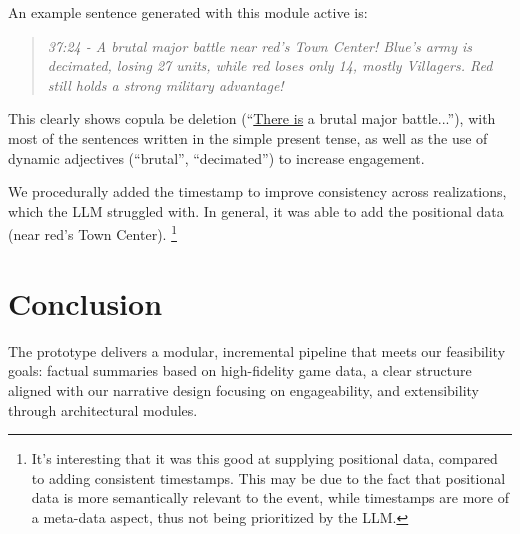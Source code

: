 An example sentence generated with this module active is:
\begin{quote}
  \textit{37:24 - A brutal major battle near red's Town Center! Blue's army is decimated, losing 27 units, while red loses only 14, mostly Villagers. Red still holds a strong military advantage!}
\end{quote}

This clearly shows copula be deletion (``\underline{There is} a brutal major battle...''), with most of the sentences written in the simple present tense, as well as the use of dynamic adjectives (``brutal'', ``decimated'') to increase engagement.

We procedurally added the timestamp to improve consistency across realizations, which the LLM struggled with. In general, it was able to add the positional data (near red's Town Center). \footnote{It's interesting that it was this good at supplying positional data, compared to adding consistent timestamps. This may be due to the fact that positional data is more semantically relevant to the event, while timestamps are more of a meta-data aspect, thus not being prioritized by the LLM.}

\section{Conclusion}\label{sec:system-design-conclusion}
The prototype delivers a modular, incremental pipeline that meets our feasibility goals: factual summaries based on high-fidelity game data, a clear structure aligned with our narrative design focusing on engageability, and extensibility through architectural modules.

